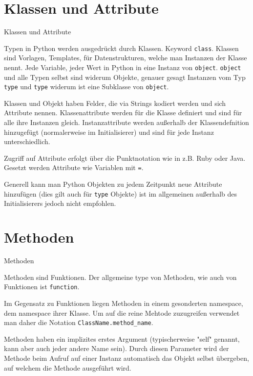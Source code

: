 \section{Klassen und Attribute}
\begin{frame}[fragile]{Klassen und Attribute}

Typen in Python werden ausgedrückt durch Klassen. Keyword \texttt{class}. Klassen sind Vorlagen, Templates, für Datenstrukturen, welche man Instanzen der Klasse nennt.
Jede Variable, jeder Wert in Python in eine Instanz von \texttt{object}. \texttt{object} und alle Typen selbst sind widerum Objekte, genauer gesagt Instanzen vom Typ \texttt{type} und \texttt{type} widerum ist eine Subklasse von \texttt{object}. 

Klassen und Objekt haben Felder, die via Strings kodiert werden und sich Attribute nennen. Klassenattribute werden für die Klasse definiert und sind für alle ihre Instanzen gleich. Instanzattribute werden außerhalb der Klassendefnition hinzugefügt (normalerweise im Initialisierer) und sind für jede Instanz unterschiedlich.

Zugriff auf Attribute erfolgt über die Punktnotation wie in z.B. Ruby oder Java. Gesetzt werden Attribute wie Variablen mit \texttt{=}.

Generell kann man Python Objekten zu jedem Zeitpunkt neue Attribute hinzufügen (dies gilt auch für \texttt{type} Objekte) ist im allgemeinen außerhalb des Initialisierers jedoch nicht empfohlen.

\end{frame}


\section{Methoden}
\begin{frame}[fragile]{Methoden}

Methoden sind Funktionen. Der allgemeine type von Methoden, wie auch von Funktionen ist \texttt{function}. 

Im Gegensatz zu Funktionen liegen Methoden in einem gesonderten namespace, dem namespace ihrer Klasse. Um auf die reine Mehtode zuzugreifen verwendet man daher die Notation \texttt{ClassName.method\_name}.

Methoden haben ein implizites erstes Argument (typischerweise "self" genannt, kann aber auch jeder andere Name sein). Durch diesen Parameter wird der Methode beim Aufruf auf einer Instanz automatisch das Objekt selbst übergeben, auf welchem die Methode ausgeführt wird.

\end{frame}
